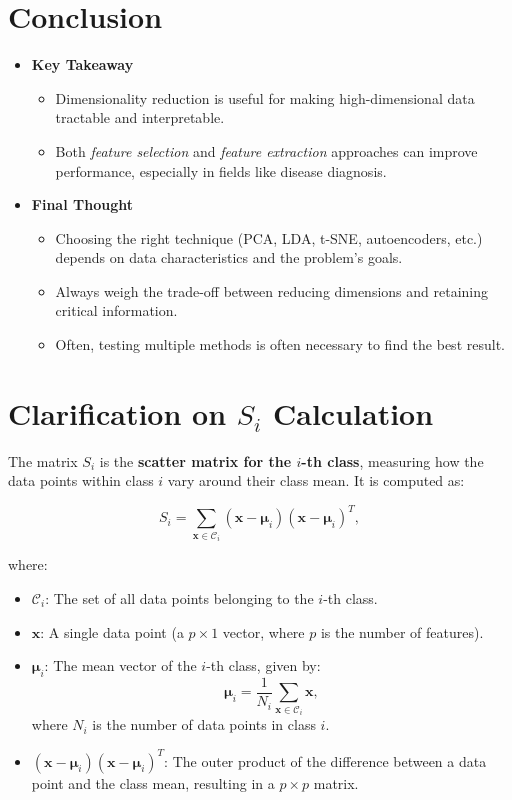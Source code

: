\documentclass[10pt]{article}
\begin{document}
\section{Conclusion}
\begin{itemize}
    \item \textbf{Key Takeaway}
    \begin{itemize}
        \item Dimensionality reduction is useful for making high-dimensional data tractable and interpretable.
        \item Both \emph{feature selection} and \emph{feature extraction} approaches can improve performance, especially in fields like disease diagnosis.
    \end{itemize}
    \item \textbf{Final Thought}
    \begin{itemize}
        \item Choosing the right technique (PCA, LDA, t-SNE, autoencoders, etc.) depends on data characteristics and the problem's goals.
        \item Always weigh the trade-off between reducing dimensions and retaining critical information.
        \item Often, testing multiple methods is often necessary to find the best result.
    \end{itemize}
\end{itemize}

\section{Clarification on \( S_i \) Calculation}

The matrix \( S_i \) is the \textbf{scatter matrix for the \(i\)-th class}, measuring how the data points within class \(i\) vary around their class mean. It is computed as:

\[
S_i = \sum_{\boldsymbol{x} \in \mathcal{C}_i} (\boldsymbol{x} - \boldsymbol{\mu}_i)(\boldsymbol{x} - \boldsymbol{\mu}_i)^T,
\]

where:
\begin{itemize}
    \item \( \mathcal{C}_i \): The set of all data points belonging to the \(i\)-th class.
    \item \( \boldsymbol{x} \): A single data point (a \(p \times 1\) vector, where \(p\) is the number of features).
    \item \( \boldsymbol{\mu}_i \): The mean vector of the \(i\)-th class, given by:
    \[
    \boldsymbol{\mu}_i = \frac{1}{N_i} \sum_{\boldsymbol{x} \in \mathcal{C}_i} \boldsymbol{x},
    \]
    where \( N_i \) is the number of data points in class \(i\).
    \item \( (\boldsymbol{x} - \boldsymbol{\mu}_i)(\boldsymbol{x} - \boldsymbol{\mu}_i)^T \): The outer product of the difference between a data point and the class mean, resulting in a \(p \times p\) matrix.
\end{itemize}
\end{document}
